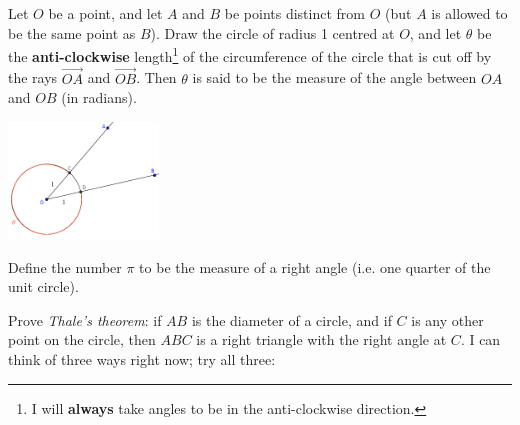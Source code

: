 \documentclass[answers]{exam}
\begin{document}
\begin{questions}
  \question Let $ O $ be a point, and let $ A $ and $ B $ be points distinct from $ O $ (but $ A $ is allowed to be the same point as $ B $).
            Draw the circle of radius 1 centred at $ O $, and let $ \theta $ be the \textbf{anti-clockwise} length\footnote{I will \textbf{always}
            take angles to be in the anti-clockwise direction.} of the circumference of the circle that is cut off by the rays $ \vec{OA} $ and
            $ \vec{OB} $. Then $ \theta $ is said to be the measure of the angle between $ OA $ and $ OB $ (in radians).
            \begin{center}
              \includegraphics[width=0.3\textwidth]{exercises-1-3}
            \end{center}
            Define the number $ \pi $ to be the measure of a right angle (i.e. one quarter of the unit circle).
  \question Prove \emph{Thale's theorem}: if $ AB $ is the diameter of a circle, and if $ C $ is any other point on the circle, then
            $ ABC $ is a right triangle with the right angle at $ C $. I can think of three ways right now; try all three:
\end{questions}
\end{document}
